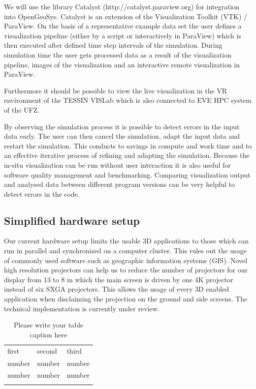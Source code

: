 We will use the library Catalyst (http://catalyst.paraview.org) for
integration into OpenGeoSys. Catalyst is an extension of the
Visualization Toolkit (VTK) / ParaView. On the basis of a representative
example data set the user defines a visualization pipeline (either by a
script or interactively in ParaView) which is then executed after
defined time step intervals of the simulation. During simulation time
the user gets processed data as a result of the visualization pipeline,
images of the visualization and an interactive remote visualization in
ParaView.

Furthermore it should be possible to view the live visualization in the
VR environment of the TESSIN VISLab which is also connected to EVE HPC
system of the UFZ.

By observing the simulation process it is possible to detect errors in
the input data early. The user can then cancel the simulation, adapt the
input data and restart the simulation. This conducts to savings in
compute and work time and to an effective iterative process of refining
and adapting the simulation. Because the in-situ visualization can be
run without user interaction it is also useful for software quality
management and benchmarking. Comparing visualization output and analysed
data between different program versions can be very helpful to detect
errors in the code.

\subsection{Simplified hardware setup}
\label{simplified-hardware-setup}

Our current hardware setup limits the usable 3D applications to those
which can run in parallel and synchronized on a computer cluster. This
rules out the usage of commonly used software such as geographic
information systems (GIS). Novel high resolution projectors can help us
to reduce the number of projectors for our display from 13 to 8 in which
the main screen is driven by one 4K projector instead of six SXGA
projectors. This allows the usage of every 3D enabled application when
disclaiming the projection on the ground and side screens. The technical
implementation is currently under review.


%
\begin{table}
\caption{Please write your table caption here}
\label{tab:1}       %
\begin{tabular}{lll}
\hline\noalign{\smallskip}
first & second & third  \\
\noalign{\smallskip}\hline\noalign{\smallskip}
number & number & number \\
number & number & number \\
\noalign{\smallskip}\hline
\end{tabular}
\end{table}


